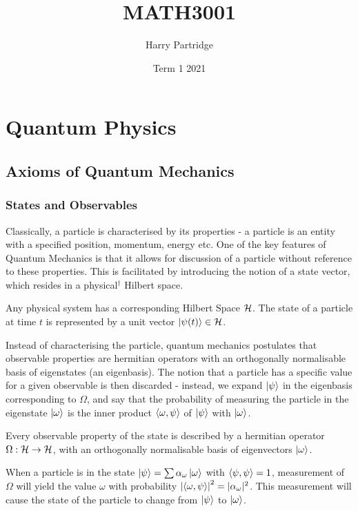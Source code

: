 \documentclass[a4paper]{article}
\title{MATH3001}
\author{Harry Partridge}
\date{Term 1 2021}
\begin{document}
\maketitle

\tableofcontents

\newpage
\section{Quantum Physics}
\subsection{Axioms of Quantum Mechanics}
\subsubsection{States and Observables}
Classically, a particle is characterised by its properties - a particle is an entity with a specified position, momentum, energy etc. One of the key features of Quantum Mechanics is that it allows for discussion of a particle without reference to these properties. This is facilitated by introducing the notion of a state vector, which resides in a physical$^\dagger$ Hilbert space. 

\begin{axiom} 
    Any physical system has a corresponding Hilbert Space $\mathcal{H}$. The state of a particle at time $t$ is represented by a unit vector $\left\lvert \psi(t) \right\rangle \in \mathcal{H}$.
\end{axiom}

Instead of characterising the particle, quantum mechanics postulates that observable properties are hermitian operators with an orthogonally normalisable basis of eigenstates (an eigenbasis). The notion that a particle has a specific value for a given observable is then discarded - instead, we expand $\left\lvert \psi \right\rangle$ in the eigenbasis corresponding to $\Omega$, and say that the probability of measuring the particle in the eigenstate $\left\lvert \omega \right\rangle$ is the inner product $\left\langle \omega , \psi \right\rangle$ of $\left\lvert \psi \right\rangle$ with $\left\lvert \omega \right\rangle$. 

\begin{axiom}[Observable]
    Every observable property of the state is described by a hermitian operator $\Omega: \mathcal{H} \to \mathcal{H}$, with an orthogonally normalisable basis of eigenvectors $\left\lvert \omega \right\rangle$. 
\end{axiom}


\begin{axiom}[Measurement]
    When a particle is in the state $\left\lvert \psi \right\rangle = \sum \alpha_\omega \left\lvert \omega \right\rangle$ with $\left\langle \psi , \psi \right\rangle = 1$, measurement of $\Omega$ will yield the value $\omega$ with probability $\left\lvert \left\langle \omega , \psi \right\rangle \right\rvert^2 = |\alpha_\omega|^2$. This measurement will cause the state of the particle to change from $\left\lvert \psi \right\rangle$ to $\left\lvert \omega \right\rangle$. 
\end{axiom}
\end{document}

